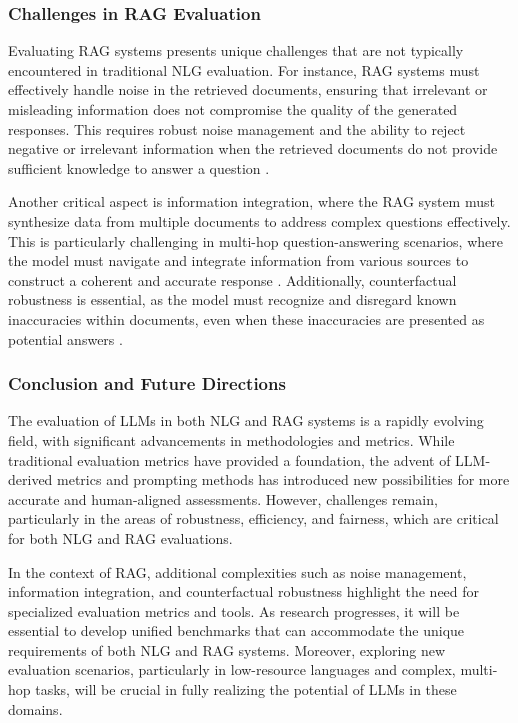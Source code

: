 \subsubsection{Challenges in RAG Evaluation}

Evaluating RAG systems presents unique challenges that are not typically encountered in traditional NLG evaluation. For instance, RAG systems must effectively handle noise in the retrieved documents, ensuring that irrelevant or misleading information does not compromise the quality of the generated responses. This requires robust noise management and the ability to reject negative or irrelevant information when the retrieved documents do not provide sufficient knowledge to answer a question \cite{gao2023retrieval}.

Another critical aspect is information integration, where the RAG system must synthesize data from multiple documents to address complex questions effectively. This is particularly challenging in multi-hop question-answering scenarios, where the model must navigate and integrate information from various sources to construct a coherent and accurate response \cite{luo2023divide}. Additionally, counterfactual robustness is essential, as the model must recognize and disregard known inaccuracies within documents, even when these inaccuracies are presented as potential answers \cite{lewis2020retrieval}.

\subsubsection{Conclusion and Future Directions}

The evaluation of LLMs in both NLG and RAG systems is a rapidly evolving field, with significant advancements in methodologies and metrics. While traditional evaluation metrics have provided a foundation, the advent of LLM-derived metrics and prompting methods has introduced new possibilities for more accurate and human-aligned assessments. However, challenges remain, particularly in the areas of robustness, efficiency, and fairness, which are critical for both NLG and RAG evaluations.

In the context of RAG, additional complexities such as noise management, information integration, and counterfactual robustness highlight the need for specialized evaluation metrics and tools. As research progresses, it will be essential to develop unified benchmarks that can accommodate the unique requirements of both NLG and RAG systems. Moreover, exploring new evaluation scenarios, particularly in low-resource languages and complex, multi-hop tasks, will be crucial in fully realizing the potential of LLMs in these domains.

